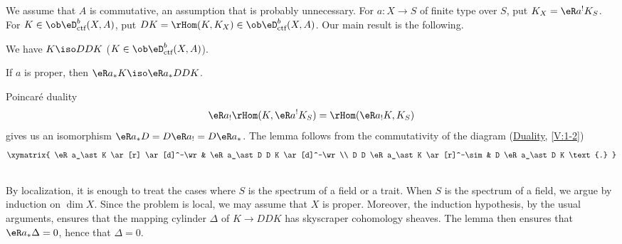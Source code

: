 \documentclass[oneside]{book}
\begin{document}
\subsection{}\label{VII:4-2}

We assume that $A$ is commutative, an assumption that is probably
unnecessary. For $a:X\to S$ of finite type over $S$, put
$K_X=\eR a^! K_S$. For $K\in\ob\eD_\text{ctf}^b(X,A)$, put
$D K=\rHom(K,K_X)\in\ob\eD_\text{ctf}^b(X,A)$. Our main result is the
following.





\begin{theorem_}\label{VII:4-3}
We have $K\iso D D K$ ($K\in \ob\eD_\textnormal{ctf}^b(X,A)$).
\end{theorem_}





\begin{lemma_}\label{VII:4-4}
If $a$ is proper, then $\eR a_\ast K \iso \eR a_\ast D D K$.
\end{lemma_}

Poincaré duality
\[
  \eR a_! \rHom(K,\eR a^! K_S) = \rHom(\eR a_! K,K_S) 
\]
gives us an isomorphism $\eR a_\ast D = D \eR a_! = D \eR a_\ast$. The lemma
follows from the commutativity of the diagram (\hyperref[V]{Duality},
\ref{V:1-2})
\[\xymatrix{
  \eR a_\ast K \ar[r] \ar[d]^-\wr 
    & \eR a_\ast D D K \ar[d]^-\wr \\
  D D \eR a_\ast K \ar[r]^-\sim 
    & D \eR a_\ast D K \text{.} 
}\]





\subsection{}\label{VII:4-5}

By localization, it is enough to treat the cases where $S$ is the spectrum
of a field or a trait. When $S$ is the spectrum of a field, we argue by
induction on $\dim X$. Since the problem is local, we may assume that $X$ is
proper. Moreover, the induction hypothesis, by the usual arguments, ensures
that the mapping cylinder $\Delta$ of $K\to D D K$ has skyscraper cohomology
sheaves. The lemma then ensures that $\eR a_\ast \Delta=0$, hence that
$\Delta=0$.





\subsection{}\label{VII:4-6}
\end{document}
